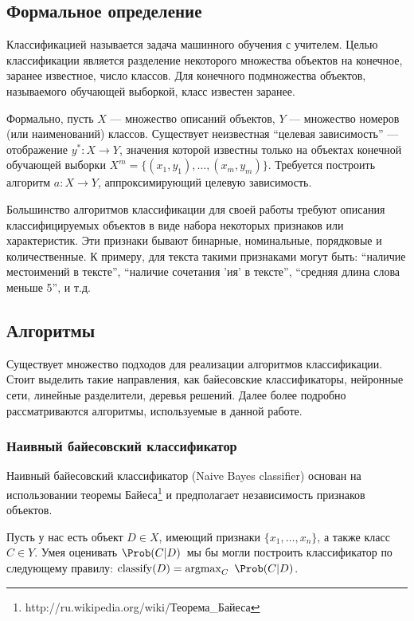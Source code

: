\subsection{Формальное определение}
Классификацией называется задача машинного обучения с учителем. Целью классификации является разделение некоторого множества объектов на конечное, заранее известное, число классов. Для конечного подмножества объектов, называемого обучающей выборкой, класс известен заранее.

Формально, пусть $X$ --- множество описаний объектов, $Y$ --- множество номеров (или наименований) классов. Существует неизвестная ``целевая зависимость'' --- отображение $y^{*}\colon X\to Y$, значения которой известны только на объектах конечной обучающей выборки $X^m = \{(x_1,y_1),\dots,(x_m,y_m)\}$. Требуется построить алгоритм $a\colon X\to Y$, аппроксимирующий целевую зависимость\cite{wiki:ru-classification}.

Большинство алгоритмов классификации для своей работы требуют описания классифицируемых объектов в виде набора некоторых признаков или характеристик. Эти признаки бывают бинарные, номинальные, порядковые и количественные. К примеру, для текста такими признаками могут быть: ``наличие местоимений в тексте'', ``наличие сочетания 'ия' в тексте'', ``средняя длина слова меньше 5'', и т.д.

\subsection{Алгоритмы}
Существует множество подходов для реализации алгоритмов классификации. Стоит выделить такие направления, как байесовские классификаторы, нейронные сети, линейные разделители, деревья решений. Далее более подробно рассматриваются алгоритмы, используемые в данной работе.

\subsubsection{Наивный байесовский классификатор}
Наивный байесовский классификатор (Naive Bayes classifier) основан на использовании теоремы Байеса\footnote{http://ru.wikipedia.org/wiki/Теорема\_Байеса} и предполагает независимость признаков объектов.

Пусть у нас есть объект $D \in X$, имеющий признаки $\{x_1,\dots,x_n\}$, а также класс $C \in Y$. Умея оценивать $\Prob(C \vert D)\,$ мы бы могли построить классификатор по следующему правилу: $\mathrm{classify}(D) = \mathop{\mathrm{argmax}}_C \ \Prob(C \vert D)$.

